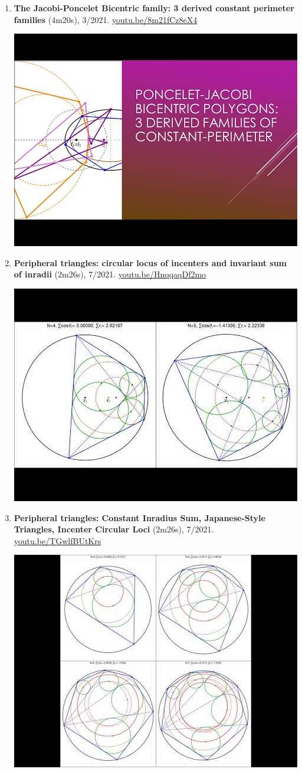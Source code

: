 \documentclass[12pt]{article}
\begin{document}
\begin{enumerate}[resume]
% 
\item \textbf{The Jacobi-Poncelet Bicentric family: 3 derived constant perimeter families} (4m20s), 3/2021. \href{https://youtu.be/8m21fCz8eX4}{\url{youtu.be/8m21fCz8eX4}}
\begin{center}\includegraphics[width=.5\textwidth]{pics/8m21fCz8eX4.jpg}\end{center}
% 
\item \textbf{Peripheral triangles: circular locus of incenters and invariant sum of inradii} (2m26s), 7/2021. \href{https://youtu.be/HnqqaqDf2mo}{\url{youtu.be/HnqqaqDf2mo}}
\begin{center}\includegraphics[width=.5\textwidth]{pics/HnqqaqDf2mo.jpg}\end{center}
% 
\item \textbf{Peripheral triangles: Constant Inradius Sum, Japanese-Style Triangles, Incenter Circular Loci} (2m26s), 7/2021. \href{https://youtu.be/TGwlfBUtKrs}{\url{youtu.be/TGwlfBUtKrs}}
\begin{center}\includegraphics[width=.5\textwidth]{pics/TGwlfBUtKrs.jpg}\end{center}

\end{enumerate}
\end{document}
